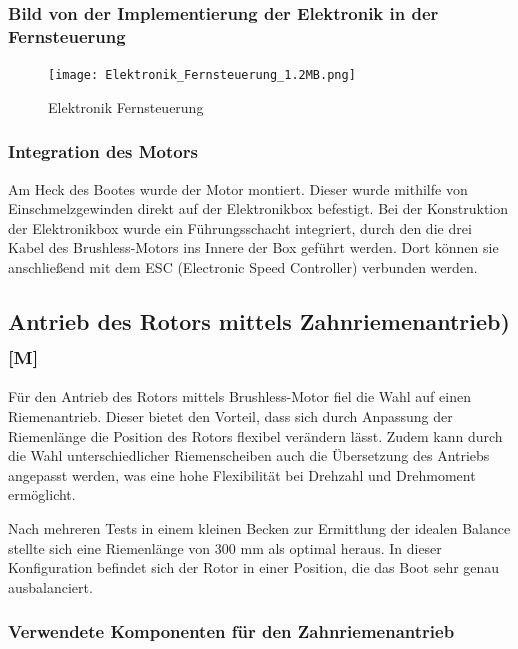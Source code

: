 \documentclass[a4paper,12pt]{article}
\begin{document}
\subsubsection{Bild von der Implementierung der Elektronik in der Fernsteuerung}

\begin{figure}[H]
    \centering
    \texttt{[image: Elektronik\_Fernsteuerung\_1.2MB.png]}
    \caption{Elektronik Fernsteuerung}
    \label{fig:Elektronik Fernsteuerung}
\end{figure}



\subsubsection{Integration des Motors}

Am Heck des Bootes wurde der Motor montiert. Dieser wurde mithilfe von Einschmelzgewinden direkt auf der Elektronikbox befestigt. Bei der Konstruktion der Elektronikbox wurde ein Führungsschacht integriert, durch den die drei Kabel des Brushless-Motors ins Innere der Box geführt werden. Dort können sie anschließend mit dem ESC (Electronic Speed Controller) verbunden werden.



\subsection{\texorpdfstring{Antrieb des Rotors mittels Zahnriemenantrieb) \textsubscript{[M]}}{Antrieb des Rotors mittels Zahnriemenantrieb) [M]}}

Für den Antrieb des Rotors mittels Brushless-Motor fiel die Wahl auf einen Riemenantrieb. Dieser bietet den Vorteil, dass sich durch Anpassung der Riemenlänge die Position des Rotors flexibel verändern lässt. Zudem kann durch die Wahl unterschiedlicher Riemenscheiben auch die Übersetzung des Antriebs angepasst werden, was eine hohe Flexibilität bei Drehzahl und Drehmoment ermöglicht.

Nach mehreren Tests in einem kleinen Becken zur Ermittlung der idealen Balance stellte sich eine Riemenlänge von 300 mm als optimal heraus. In dieser Konfiguration befindet sich der Rotor in einer Position, die das Boot sehr genau ausbalanciert.\newline

\subsubsection{Verwendete Komponenten für den Zahnriemenantrieb}
\end{document}
